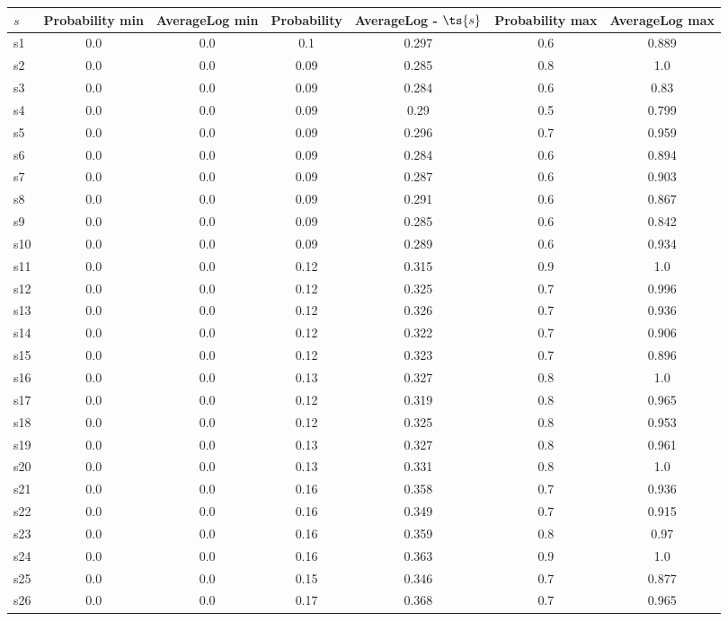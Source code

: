 \documentclass{article}
\begin{document}
\noindent\begin{tabular}{|l|c|c|c|c|c|c|}
\hline
$s$& Probability min & AverageLog min & Probability & AverageLog - $\ts{s}$ & Probability max & AverageLog max\\
\hline
s1 &0.0 & 0.0 & 0.1 & 0.297 & 0.6 & 0.889\\
\hline
s2 &0.0 & 0.0 & 0.09 & 0.285 & 0.8 & 1.0\\
\hline
s3 &0.0 & 0.0 & 0.09 & 0.284 & 0.6 & 0.83\\
\hline
s4 &0.0 & 0.0 & 0.09 & 0.29 & 0.5 & 0.799\\
\hline
s5 &0.0 & 0.0 & 0.09 & 0.296 & 0.7 & 0.959\\
\hline
s6 &0.0 & 0.0 & 0.09 & 0.284 & 0.6 & 0.894\\
\hline
s7 &0.0 & 0.0 & 0.09 & 0.287 & 0.6 & 0.903\\
\hline
s8 &0.0 & 0.0 & 0.09 & 0.291 & 0.6 & 0.867\\
\hline
s9 &0.0 & 0.0 & 0.09 & 0.285 & 0.6 & 0.842\\
\hline
s10 &0.0 & 0.0 & 0.09 & 0.289 & 0.6 & 0.934\\
\hline
s11 &0.0 & 0.0 & 0.12 & 0.315 & 0.9 & 1.0\\
\hline
s12 &0.0 & 0.0 & 0.12 & 0.325 & 0.7 & 0.996\\
\hline
s13 &0.0 & 0.0 & 0.12 & 0.326 & 0.7 & 0.936\\
\hline
s14 &0.0 & 0.0 & 0.12 & 0.322 & 0.7 & 0.906\\
\hline
s15 &0.0 & 0.0 & 0.12 & 0.323 & 0.7 & 0.896\\
\hline
s16 &0.0 & 0.0 & 0.13 & 0.327 & 0.8 & 1.0\\
\hline
s17 &0.0 & 0.0 & 0.12 & 0.319 & 0.8 & 0.965\\
\hline
s18 &0.0 & 0.0 & 0.12 & 0.325 & 0.8 & 0.953\\
\hline
s19 &0.0 & 0.0 & 0.13 & 0.327 & 0.8 & 0.961\\
\hline
s20 &0.0 & 0.0 & 0.13 & 0.331 & 0.8 & 1.0\\
\hline
s21 &0.0 & 0.0 & 0.16 & 0.358 & 0.7 & 0.936\\
\hline
s22 &0.0 & 0.0 & 0.16 & 0.349 & 0.7 & 0.915\\
\hline
s23 &0.0 & 0.0 & 0.16 & 0.359 & 0.8 & 0.97\\
\hline
s24 &0.0 & 0.0 & 0.16 & 0.363 & 0.9 & 1.0\\
\hline
s25 &0.0 & 0.0 & 0.15 & 0.346 & 0.7 & 0.877\\
\hline
s26 &0.0 & 0.0 & 0.17 & 0.368 & 0.7 & 0.965\\

\end{tabular}
\end{document}
